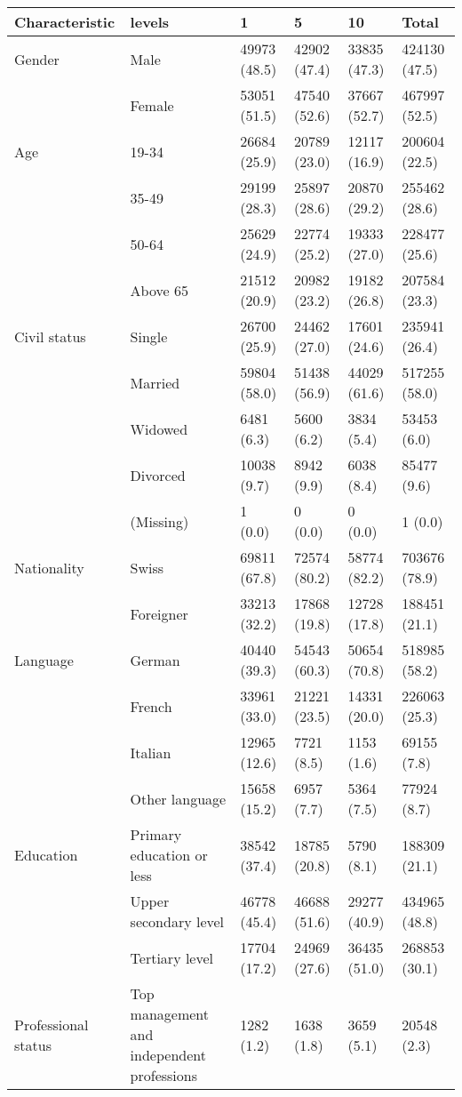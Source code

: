 
\begin{tabular}{llllll}
\toprule
Characteristic & levels & 1 & 5 & 10 & Total\\
\midrule
Gender & Male & 49973 (48.5) & 42902 (47.4) & 33835 (47.3) & 424130 (47.5)\\
 & Female & 53051 (51.5) & 47540 (52.6) & 37667 (52.7) & 467997 (52.5)\\
\addlinespace
Age & 19-34 & 26684 (25.9) & 20789 (23.0) & 12117 (16.9) & 200604 (22.5)\\
 & 35-49 & 29199 (28.3) & 25897 (28.6) & 20870 (29.2) & 255462 (28.6)\\
 & 50-64 & 25629 (24.9) & 22774 (25.2) & 19333 (27.0) & 228477 (25.6)\\
 & Above 65 & 21512 (20.9) & 20982 (23.2) & 19182 (26.8) & 207584 (23.3)\\
\addlinespace
Civil status & Single & 26700 (25.9) & 24462 (27.0) & 17601 (24.6) & 235941 (26.4)\\
 & Married & 59804 (58.0) & 51438 (56.9) & 44029 (61.6) & 517255 (58.0)\\
 & Widowed & 6481 (6.3) & 5600 (6.2) & 3834 (5.4) & 53453 (6.0)\\
 & Divorced & 10038 (9.7) & 8942 (9.9) & 6038 (8.4) & 85477 (9.6)\\
 & (Missing) & 1 (0.0) & 0 (0.0) & 0 (0.0) & 1 (0.0)\\
\addlinespace
Nationality & Swiss & 69811 (67.8) & 72574 (80.2) & 58774 (82.2) & 703676 (78.9)\\
 & Foreigner & 33213 (32.2) & 17868 (19.8) & 12728 (17.8) & 188451 (21.1)\\
\addlinespace
Language & German & 40440 (39.3) & 54543 (60.3) & 50654 (70.8) & 518985 (58.2)\\
 & French & 33961 (33.0) & 21221 (23.5) & 14331 (20.0) & 226063 (25.3)\\
 & Italian & 12965 (12.6) & 7721 (8.5) & 1153 (1.6) & 69155 (7.8)\\
 & Other language & 15658 (15.2) & 6957 (7.7) & 5364 (7.5) & 77924 (8.7)\\
\addlinespace
Education & Primary education or less & 38542 (37.4) & 18785 (20.8) & 5790 (8.1) & 188309 (21.1)\\
 & Upper secondary level & 46778 (45.4) & 46688 (51.6) & 29277 (40.9) & 434965 (48.8)\\
 & Tertiary level & 17704 (17.2) & 24969 (27.6) & 36435 (51.0) & 268853 (30.1)\\
\addlinespace
Professional status & Top management and independent professions & 1282 (1.2) & 1638 (1.8) & 3659 (5.1) & 20548 (2.3)\\

\end{tabular}
